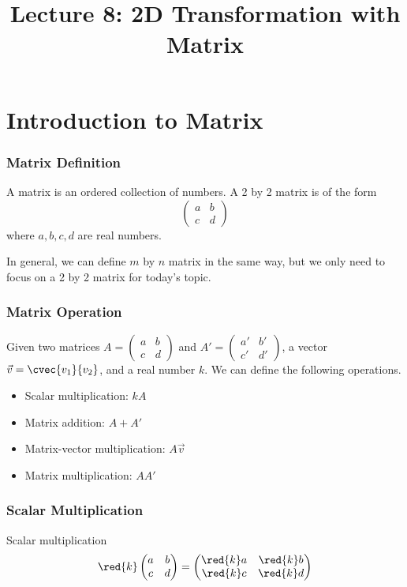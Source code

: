\title{Lecture 8: 2D Transformation with Matrix}
\frame{\titlepage}

\section[Intro. to Matrix]{Introduction to Matrix}
\frame{\sectionpage}

\begin{frame}
\frametitle{Matrix Definition}
\begin{defn}{}{}
A matrix is an ordered collection of numbers. A 2 by 2 matrix is of the form
\[ \begin{pmatrix} a & b \\ c & d \end{pmatrix}\]
where $a,b,c,d$ are real numbers.
\end{defn}
In general, we can define $m$ by $n$ matrix in the same way, but we only need to focus on a 2 by 2 matrix for today's topic.
\end{frame}


\begin{frame}
\frametitle{Matrix Operation}
Given two matrices $A = \begin{pmatrix} a & b \\ c & d \end{pmatrix}$ and $A' = \begin{pmatrix} a' & b' \\ c' & d' \end{pmatrix}$, a vector $\vec{v} = \cvec{v_1}{v_2}$, and a real number $k$. We can define the following operations.
\begin{itemize}
\item Scalar multiplication: $kA$
\item Matrix addition: $A + A'$
\item Matrix-vector multiplication: $A\vec{v}$
\item Matrix multiplication: $AA'$
\end{itemize}
\end{frame}


\begin{frame}
\frametitle{Scalar Multiplication}
\begin{defn}{Scalar multiplication}{}
\begin{equation}
\red{k}\begin{pmatrix} a & b \\ c & d \end{pmatrix}= \begin{pmatrix} \red{k}a & \red{k}b \\ \red{k}c & \red{k}d \end{pmatrix}
\end{equation}
\end{defn}
\end{frame}


